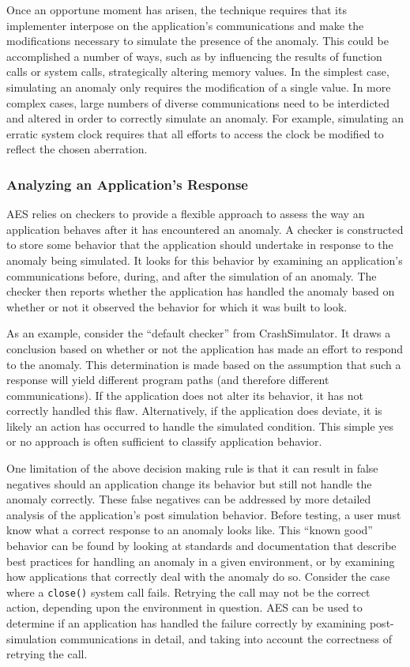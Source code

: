 Once an opportune moment has arisen,
the technique requires that its implementer
interpose on the application's communications
and make the modifications necessary
to simulate the presence
of the anomaly.
This could be accomplished
a number of ways,
such as
by influencing the results of function calls or system calls,
strategically altering memory values.
In the simplest case,
simulating an anomaly only requires
the modification of a single value.
In more complex cases,
large numbers of diverse communications
need to be interdicted and altered
in order to correctly simulate an anomaly.
For example,
simulating an erratic system clock
requires that all efforts
to access the clock
be modified to reflect the chosen aberration.

\subsubsection{Analyzing an Application's Response}
\label{SUBSUB:AnalyzingResponse}
AES relies on checkers
to provide a flexible approach to assess the way an application
behaves after it has encountered an anomaly.
A checker is constructed to store
some behavior that the application should undertake
in response to the anomaly being simulated.
It looks for this behavior by examining an application's communications
before, during, and after the simulation of an anomaly.
The checker then reports whether the application has handled
the anomaly based on whether or not it observed the behavior for which it
was built to look.

As an example, consider the ``default checker'' from CrashSimulator.
It draws a conclusion based on
whether or not the application
has made an effort to respond
to the anomaly.
This determination is made based
on the assumption
that such a response will yield
different program paths (and therefore different communications).
If the application
does not alter its behavior, it has not
correctly handled this flaw.
Alternatively,
if the application does deviate,
it is likely
an action has occurred to handle the simulated condition.
This simple yes or no approach
is often sufficient
to classify application behavior.

One limitation of the above decision making rule
is that it can result in false negatives
should an application change its behavior
but still not handle the anomaly correctly.
These false negatives can be addressed
by more detailed analysis
of the application's post simulation behavior.
Before testing,
a user must know
what a correct response
to an anomaly looks like.
This ``known good'' behavior can be found
by looking at standards and documentation
that describe best practices for handling an anomaly
in a given environment,
or by examining how applications that correctly
deal with the anomaly do so.
Consider the case where a {\tt close()} system call fails.
Retrying the call may not be the correct action,
depending upon the environment in question.
AES can be used to determine if an application
has handled the failure correctly
by examining post-simulation communications in detail,
and taking into account the correctness of retrying the call.


